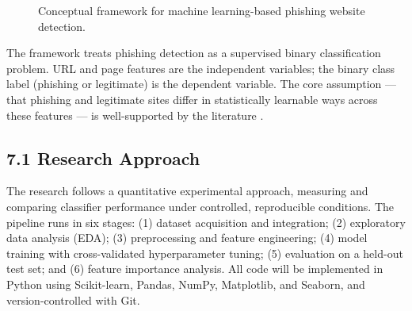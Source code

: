 \documentclass[11pt,letterpaper]{article}
\begin{document}
\begin{figure}[h!]
\centering
{}
\caption{Conceptual framework for machine learning-based phishing website detection.}
\label{fig:framework}
\end{figure}
\FloatBarrier

The framework treats phishing detection as a supervised binary classification problem. URL and page features are the independent variables; the binary class label (phishing or legitimate) is the dependent variable. The core assumption --- that phishing and legitimate sites differ in statistically learnable ways across these features --- is well-supported by the literature \cite{mohammad2014, sahingoz2019}.

\subsection*{7.1 Research Approach}

The research follows a quantitative experimental approach, measuring and comparing classifier performance under controlled, reproducible conditions. The pipeline runs in six stages: (1) dataset acquisition and integration; (2) exploratory data analysis (EDA); (3) preprocessing and feature engineering; (4) model training with cross-validated hyperparameter tuning; (5) evaluation on a held-out test set; and (6) feature importance analysis. All code will be implemented in Python using Scikit-learn, Pandas, NumPy, Matplotlib, and Seaborn, and version-controlled with Git.
\end{document}
